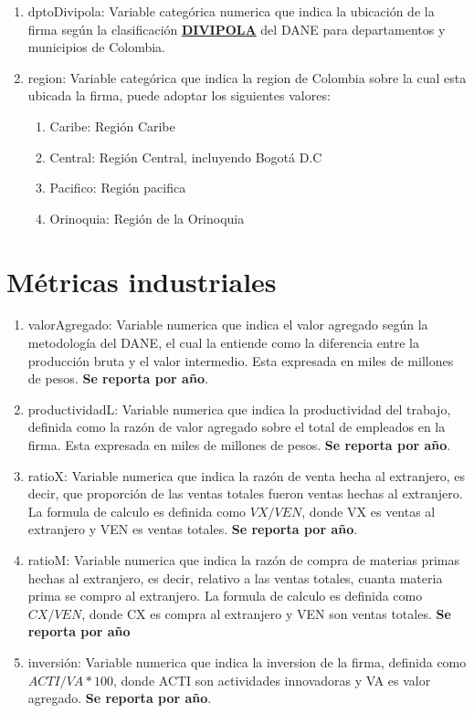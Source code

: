 \documentclass[12pt,a4paper]{article}
\begin{document}
\begin{enumerate}
	\item dptoDivipola: Variable categórica numerica que indica la ubicación de la firma según la clasificación \href{https://geoportal.dane.gov.co/geovisores/territorio/consulta-divipola-division-politico-administrativa-de-colombia/}{\textbf{DIVIPOLA}} del DANE para departamentos y municipios de Colombia. 
	\item region: Variable categórica que indica la region de Colombia sobre la cual esta ubicada la firma, puede adoptar los siguientes valores:
		\begin{enumerate}
			\item Caribe: Región Caribe
			\item Central: Región Central, incluyendo Bogotá D.C 
			\item Pacifico: Región pacifica
			\item Orinoquia: Región de la Orinoquia
		\end{enumerate}
\end{enumerate} 

\section{Métricas industriales}

\begin{enumerate}
	\item valorAgregado: Variable numerica que indica el valor agregado según la metodología del DANE, el cual la entiende como la diferencia entre la producción bruta y el valor intermedio. Esta expresada en miles de millones de pesos. \textbf{Se reporta por año}.
	\item productividadL: Variable numerica que indica la productividad del trabajo, definida como la razón de valor agregado sobre el total de empleados en la firma. Esta expresada en miles de millones de pesos. \textbf{Se reporta por año}.
	\item ratioX: Variable numerica que indica la razón de venta hecha al extranjero, es decir, que proporción de las ventas totales fueron ventas hechas al extranjero. La formula de calculo es definida como $ VX / VEN $, donde VX es ventas al extranjero y VEN es ventas totales. \textbf{Se reporta por año}.
	\item ratioM: Variable numerica que indica la razón de compra de materias primas hechas al extranjero, es decir, relativo a las ventas totales, cuanta materia prima se compro al extranjero. La formula de calculo es definida como $ CX/VEN $, donde CX es compra al extranjero y VEN son ventas totales. \textbf{Se reporta por año}
	\item inversión: Variable numerica que indica la inversion de la firma, definida como $ ACTI/VA*100 $, donde ACTI son actividades innovadoras y VA es valor agregado. \textbf{Se reporta por año}.
\end{enumerate}
\end{document}
